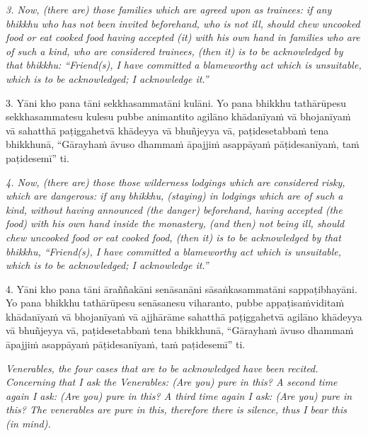 \documentclass[11pt]{article}
\newcommand{\EnglishColumn}[1]{\itshape\footnotesize{#1}}
\begin{document}
\begin{paracol}{2}
\begin{column}
{\EnglishColumn
3. Now, (there are) those families which are agreed upon as trainees: if any bhikkhu who has not been invited beforehand, who is not ill, should chew uncooked food or eat cooked food having accepted (it) with his own hand in families who are of such a kind, who are considered trainees, (then it) is to be acknowledged by that bhikkhu: “Friend(s), I have committed a blameworthy act which is unsuitable, which is to be acknowledged; I acknowledge it.”
}
\switchcolumn

\begin{flushleft}
3. Yāni kho pana tāni sekkhasammatāni kulāni. Yo pana bhikkhu tathārūpesu sekkhasammatesu kulesu pubbe animantito agilāno khādanīyaṁ vā bhojanīyaṁ vā sahatthā paṭiggahetvā khādeyya vā bhuñjeyya vā, paṭidesetabbaṁ tena bhikkhunā, “Gārayhaṁ āvuso dhammaṁ āpajjiṁ asappāyaṁ pāṭidesanīyaṁ, taṁ paṭidesemī” ti.
\switchcolumn*
\end{flushleft}

{\EnglishColumn
4. Now, (there are) those those wilderness lodgings which are considered risky, which are dangerous: if any bhikkhu, (staying) in lodgings which are of such a kind, without having announced (the danger) beforehand, having accepted (the food) with his own hand inside the monastery, (and then) not being ill, should chew uncooked food or eat cooked food, (then it) is to be acknowledged by that bhikkhu, “Friend(s), I have committed a blameworthy act which is unsuitable, which is to be acknowledged; I acknowledge it.”
}
\switchcolumn

\begin{flushleft}
4. Yāni kho pana tāni āraññakāni senāsanāni sāsaṅkasammatāni sappaṭibhayāni. Yo pana bhikkhu tathārūpesu senāsanesu viharanto, pubbe appaṭisaṁviditaṁ khādanīyaṁ vā bhojanīyaṁ vā ajjhārāme sahatthā paṭiggahetvā agilāno khādeyya vā bhuñjeyya vā, paṭidesetabbaṁ tena bhikkhunā, “Gārayhaṁ āvuso dhammaṁ āpajjiṁ asappāyaṁ pāṭidesanīyaṁ, taṁ paṭidesemī” ti.
\switchcolumn*
\end{flushleft}

{\EnglishColumn
Venerables, the four cases that are to be acknowledged have been recited.\newline
Concerning that I ask the Venerables: (Are you) pure in this?\newline
A second time again I ask: (Are you) pure in this?\newline
A third time again I ask: (Are you) pure in this?\newline
The venerables are pure in this, therefore there is silence, thus I bear this (in mind).
}
\switchcolumn


\end{column}
\end{paracol}
\end{document}

